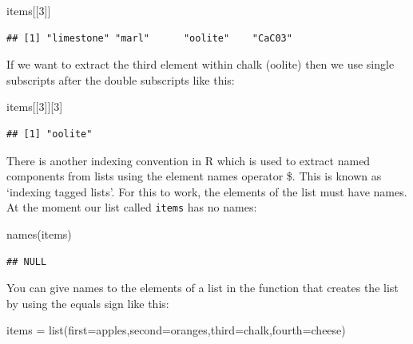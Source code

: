 \documentclass[
]{book}
\newenvironment{Shaded}{\begin{snugshade}}{\end{snugshade}}
\newcommand{\AttributeTok}[1]{\textcolor[rgb]{0.77,0.63,0.00}{#1}}
\newcommand{\DecValTok}[1]{\textcolor[rgb]{0.00,0.00,0.81}{#1}}
\newcommand{\FunctionTok}[1]{\textcolor[rgb]{0.00,0.00,0.00}{#1}}
\newcommand{\NormalTok}[1]{#1}
\newcommand{\OtherTok}[1]{\textcolor[rgb]{0.56,0.35,0.01}{#1}}
\theoremstyle{definition}
\theoremstyle{definition}
\theoremstyle{definition}
\theoremstyle{definition}
\theoremstyle{remark}
\begin{document}
\begin{Shaded}
\begin{Highlighting}[]
\NormalTok{items[[}\DecValTok{3}\NormalTok{]]}
\end{Highlighting}
\end{Shaded}

\begin{verbatim}
## [1] "limestone" "marl"      "oolite"    "CaC03"
\end{verbatim}

If we want to extract the third element within chalk (oolite) then we use single subscripts after the double subscripts like this:

\begin{Shaded}
\begin{Highlighting}[]
\NormalTok{items[[}\DecValTok{3}\NormalTok{]][}\DecValTok{3}\NormalTok{]}
\end{Highlighting}
\end{Shaded}

\begin{verbatim}
## [1] "oolite"
\end{verbatim}

There is another indexing convention in R which is used to extract named components from lists using the element names operator \$. This is known as `indexing tagged lists'. For this to work, the elements of the list must have names. At the moment our list called \texttt{items} has no names:

\begin{Shaded}
\begin{Highlighting}[]
\FunctionTok{names}\NormalTok{(items)}
\end{Highlighting}
\end{Shaded}

\begin{verbatim}
## NULL
\end{verbatim}

You can give names to the elements of a list in the function that creates the list by using the equals sign like this:

\begin{Shaded}
\begin{Highlighting}[]
\NormalTok{items }\OtherTok{=} \FunctionTok{list}\NormalTok{(}\AttributeTok{first=}\NormalTok{apples,}\AttributeTok{second=}\NormalTok{oranges,}\AttributeTok{third=}\NormalTok{chalk,}\AttributeTok{fourth=}\NormalTok{cheese)}
\end{Highlighting}
\end{Shaded}
\end{document}

